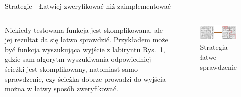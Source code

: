 \documentclass[polish,aspectratio=169]{beamer}
\newcommand{\refrys}[1]{Rys.~\ref{#1}}
\begin{document}
\begin{frame}{Strategie - Łatwiej zweryfikować niż zaimplementować}
    \begin{columns}[t]
            Niekiedy testowana funkcja jest skomplikowana, ale jej rezultat da się łatwo sprawdzić. Przykładem może być funkcja wyszukująca wyjście z labiryntu \refrys{fig:easy_verification_strategy}, gdzie sam algorytm wyszukiwania odpowiedniej ścieżki jest skomplikowany, 
            natomiast samo sprawdzenie, czy ścieżka dobrze prowadzi do wyjścia można w łatwy sposób zweryfikować.
        \centering
        \begin{figure}
            \centering
            \includegraphics[width=1\textwidth]{images/property_easy_verification.png}
            \caption{Strategia - łatwe sprawdzenie}
            \label{fig:easy_verification_strategy}
        \end{figure}    
    \end{columns}
\end{frame}
\end{document}
